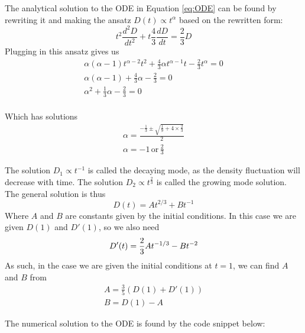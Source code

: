The analytical solution to the ODE in Equation \ref{eq:ODE} can be found by rewriting it and making the ansatz $D(t) \propto t^\alpha$ based on the rewritten form:
\begin{equation}
t^2\frac{d^2D}{dt^2} + t\frac{4}{3} \frac{dD}{dt} = \frac{2}{3} D
\end{equation}
Plugging in this ansatz gives us
\begin{equation}
\begin{split}
\alpha(\alpha-1)t^{\alpha-2}t^2 + \frac{4}{3}\alpha t^{\alpha-1}t -\frac{2}{3}t^\alpha = 0 \\
\alpha(\alpha-1) + \frac{4}{3}\alpha -\frac{2}{3} = 0 \\
\alpha^2+\frac{1}{3}\alpha -\frac{2}{3} = 0 \\
\end{split}
\end{equation}

Which has solutions
\begin{equation}
\begin{split}
\alpha = \frac{-\frac{1}{3} \pm \sqrt{\frac{1}{9}+4\times\frac{2}{3}}}{2} \\
\alpha = -1 \mathrm{\, or \,} \frac{2}{3}
\end{split}
\end{equation}

The solution $D_1 \propto t^{-1}$ is called the decaying mode, as the density fluctuation will decrease with time. The solution $D_2 \propto t^{\frac{2}{3}}$ is called the growing mode solution. The general solution is thus
\begin{equation}
D(t) = A t^{2/3} + B t^{-1}
\end{equation}
Where $A$ and $B$ are constants given by the initial conditions. In this case we are given $D(1)$ and $D'(1)$, so we also need
\begin{equation}
D'(t) = \frac{2}{3} A t^{-1/3} - B t^{-2} \\
\end{equation}
As such, in the case we are given the initial conditions at $t=1$, we can find $A$ and $B$ from
\begin{equation}
\begin{split}
A = \frac{3}{5} (D(1) + D'(1)) \\
B = D(1) - A
\end{split}
\end{equation}

The numerical solution to the ODE is found by the code snippet below:

